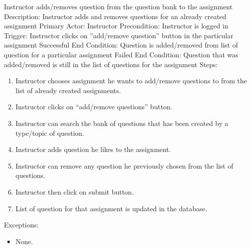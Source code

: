     \begin{section}{Instructor adds/removes question from the question bank to the assignment}
		Description: Instructor adds and removes questions for an already created assignment \newline
		Primary Actor: Instructor \newline
		Precondition:  Instructor is logged in \newline
		Trigger: Instructor clicks on ''add/remove question'' button in the particular assignment \newline
		Successful End Condition: Question is added/removed from list of question for a particular assignment \newline
		Failed End Condition: Question that was added/removed is still in the list of questions for the assignment \newline
		\newline
        Steps:
        \begin{enumerate}
            \item{Instructor chooses assignment he wants to add/remove questions to from the list of already created assignments.}
            \item{Instructor clicks on “add/remove questions” button.}
            \item{Instructor can search the bank of questions that has been created by a type/topic of question.}
            \item{Instructor adds question he likes to the assignment.}
            \item{Instructor can remove any question he previously chosen from the list of questions.}
            \item{Instructor then click on submit button.}
			\item{List of question for that assignment is updated in the database.}
        \end{enumerate}
        Exceptions:
        \begin{itemize}
            \item{None.}
        \end{itemize}
    \end{section}
    

